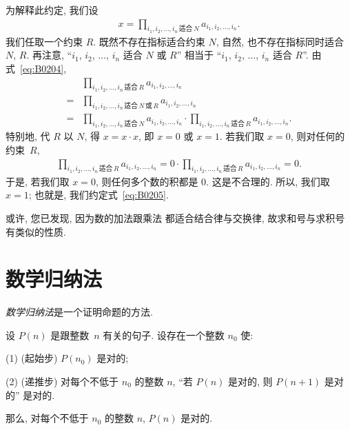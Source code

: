 \documentclass[../libro.tex]{subfiles}
\begin{document}
为解释此约定, 我们设
\begin{align*}
    x = \prod_{i_1,i_2,\dots,i_n\,\text{适合}\,N}
    {a_{i_1, i_2, \dots, i_n}}.
\end{align*}
我们任取一个约束 \(R\).
既然不存在指标适合约束 \(N\),
自然, 也不存在指标同时适合 \(N\), \(R\).
再注意,
``\(i_1\), \(i_2\), \(\dots\), \(i_n\)
适合 \(N\) 或 \(R\)''
相当于
``\(i_1\), \(i_2\), \(\dots\), \(i_n\)
适合 \(R\)''.
由式~\eqref{eq:B0204},
\begin{align*}
    &
    \prod_{i_1,i_2,\dots,i_n\,\text{适合}\,R}
    {a_{i_1, i_2, \dots, i_n}}
    \\
    = {} &
    \prod_{i_1,i_2,\dots,i_n\,\text{适合}\,N\,\text{或}\,R}
    {a_{i_1, i_2, \dots, i_n}}
    \\
    = {} &
    \prod_{i_1,i_2,\dots,i_n\,\text{适合}\,N}
    {a_{i_1, i_2, \dots, i_n}}
    \cdot \prod_{i_1,i_2,\dots,i_n\,\text{适合}\,R}
    {a_{i_1, i_2, \dots, i_n}}.
\end{align*}
特别地, 代 \(R\) 以 \(N\), 得 \(x = x \cdot x\),
即 \(x = 0\) 或 \(x = 1\).
若我们取 \(x = 0\),
则对任何的约束~\(R\),
\begin{align*}
    \prod_{i_1,i_2,\dots,i_n\,\text{适合}\,R}
    {a_{i_1, i_2, \dots, i_n}}
    = 0
    \cdot \prod_{i_1,i_2,\dots,i_n\,\text{适合}\,R}
    {a_{i_1, i_2, \dots, i_n}}
    = 0.
\end{align*}
于是, 若我们取 \(x = 0\),
则任何多个数的积都是 \(0\).
这是不合理的.
所以, 我们取 \(x = 1\);
也就是, 我们约定式~\eqref{eq:B0205}.

\vspace{2ex}

或许, 您已发现, 因为数的加法跟乘法%
都适合结合律与交换律,
故求和号与求积号有类似的性质.

\section{数学归纳法}

\emph{数学归纳法}是一个证明命题的方法.

\begin{principle}[数学归纳法]
    设 \(P(n)\) 是跟整数~\(n\) 有关的句子.
    设存在一个整数 \(n_0\) 使:

    (1)
    (起始步)
    \(P(n_0)\) 是对的;

    (2)
    (递推步)
    对每个不低于 \(n_0\) 的整数 \(n\),
    ``若 \(P(n)\) 是对的, 则 \(P(n+1)\) 是对的''
    是对的.

    那么, 对每个不低于 \(n_0\) 的整数 \(n\),
    \(P(n)\) 是对的.
\end{principle}
\end{document}
